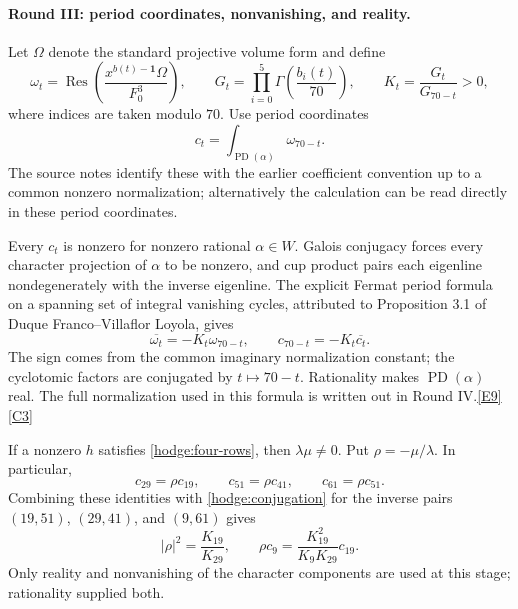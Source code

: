 \documentclass[11pt]{article}
\newcommand{\Res}{\operatorname{Res}}
\newcommand{\PD}{\operatorname{PD}}
\newcommand{\src}[1]{\hyperlink{src:#1}{[#1]}}
\begin{document}
\paragraph{Round III: period coordinates, nonvanishing, and reality.}
Let $\Omega$ denote the standard projective volume form and define
\begin{equation}\label{hodge:period-coordinates}
 \omega_t=\Res\left(\frac{x^{b(t)-\mathbf1}\Omega}{F_0^3}\right),
 \qquad G_t=\prod_{i=0}^{5}\Gamma\left(\frac{b_i(t)}{70}\right),
 \qquad K_t=\frac{G_t}{G_{70-t}}>0,
\end{equation}
where indices are taken modulo $70$. Use period coordinates
\[
 c_t=\int_{\PD(\alpha)}\omega_{70-t}.
\]
The source notes identify these with the earlier coefficient convention up
to a common nonzero normalization; alternatively the calculation can be
read directly in these period coordinates.

Every $c_t$ is nonzero for nonzero rational $\alpha\in W$. Galois conjugacy
forces every character projection of $\alpha$ to be nonzero, and cup
product pairs each eigenline nondegenerately with the inverse eigenline.
The explicit Fermat period formula on a spanning set of integral vanishing
cycles, attributed to Proposition 3.1 of Duque Franco--Villaflor Loyola,
gives
\begin{equation}\label{hodge:conjugation}
 \overline{\omega_t}=-K_t\omega_{70-t},\qquad
 c_{70-t}=-K_t\overline{c_t}.
\end{equation}
The sign comes from the common imaginary normalization constant; the
cyclotomic factors are conjugated by $t\mapsto70-t$. Rationality makes
$\PD(\alpha)$ real. The full normalization used in this formula is written
out in Round IV.\src{E9}\src{C3}

If a nonzero $h$ satisfies \eqref{hodge:four-rows}, then
$\lambda\mu\ne0$. Put $\rho=-\mu/\lambda$. In particular,
\[
 c_{29}=\rho c_{19},\qquad
 c_{51}=\rho c_{41},\qquad
 c_{61}=\rho c_{51}.
\]
Combining these identities with \eqref{hodge:conjugation} for the inverse
pairs $(19,51)$, $(29,41)$, and $(9,61)$ gives
\begin{equation}\label{hodge:rho}
 |\rho|^2=\frac{K_{19}}{K_{29}},\qquad
 \rho c_9=\frac{K_{19}^2}{K_9K_{29}}c_{19}.
\end{equation}
Only reality and nonvanishing of the character components are used at this
stage; rationality supplied both.
\end{document}
